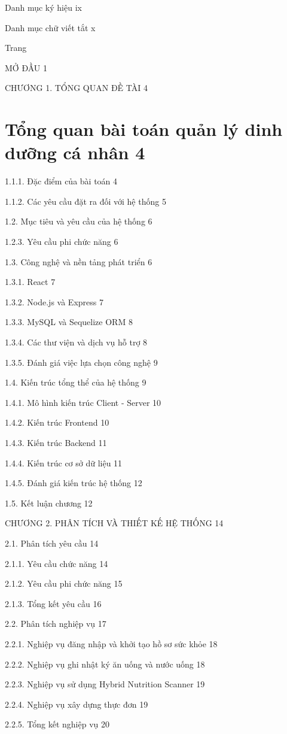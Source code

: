 Danh mục ký hiệu	ix

Danh mục chữ viết tắt	x

Trang

MỞ ĐẦU	1

CHƯƠNG 1. TỔNG QUAN ĐỀ TÀI	4


\section{Tổng quan bài toán quản lý dinh dưỡng cá nhân	4}
1.1.1. Đặc điểm của bài toán	4

1.1.2. Các yêu cầu đặt ra đối với hệ thống	5

1.2. Mục tiêu và yêu cầu của hệ thống	6

1.2.3. Yêu cầu phi chức năng	6

1.3. Công nghệ và nền tảng phát triển	6

1.3.1. React	7

1.3.2. Node.js và Express	7

1.3.3. MySQL và Sequelize ORM	8

1.3.4. Các thư viện và dịch vụ hỗ trợ	8

1.3.5. Đánh giá việc lựa chọn công nghệ	9

1.4. Kiến trúc tổng thể của hệ thống	9

1.4.1. Mô hình kiến trúc Client - Server	10

1.4.2. Kiến trúc Frontend	10

1.4.3. Kiến trúc Backend	11

1.4.4. Kiến trúc cơ sở dữ liệu	11

1.4.5. Đánh giá kiến trúc hệ thống	12

1.5. Kết luận chương	12

CHƯƠNG 2. PHÂN TÍCH VÀ THIẾT KẾ HỆ THỐNG	14

2.1. Phân tích yêu cầu	14

2.1.1. Yêu cầu chức năng	14

2.1.2. Yêu cầu phi chức năng	15

2.1.3. Tổng kết yêu cầu	16

2.2. Phân tích nghiệp vụ	17

2.2.1. Nghiệp vụ đăng nhập và khởi tạo hồ sơ sức khỏe	18

2.2.2. Nghiệp vụ ghi nhật ký ăn uống và nước uống	18

2.2.3. Nghiệp vụ sử dụng Hybrid Nutrition Scanner	19

2.2.4. Nghiệp vụ xây dựng thực đơn	19

2.2.5. Tổng kết nghiệp vụ	20

